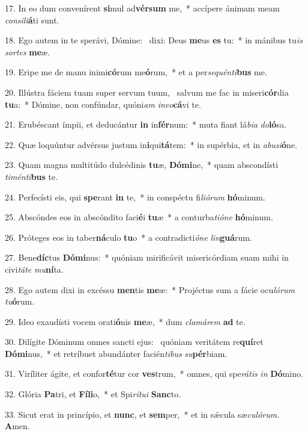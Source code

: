 17. In eo dum convenírent \textbf{si}mul ad\textbf{vér}\textbf{sum} me,~*  accípere ánimam meam \textit{con}\textit{si}\textit{li}\textbf{á}ti sunt.\

18. Ego autem in te sperávi, Dómine: \dag\  dixi: Deus \textbf{me}us \textbf{es} tu:~*  in mánibus tu\textit{is} \textit{sor}\textit{tes} \textbf{me}æ.\

19. Eripe me de manu inimi\textbf{có}rum me\textbf{ó}rum,~*  et a per\textit{se}\textit{quén}\textit{ti}\textbf{bus} me.\

20. Illústra fáciem tuam super servum tuum, \dag\  salvum me fac in miseri\textbf{cór}dia \textbf{tu}a:~*  Dómine, non confúndar, quóni\textit{am} \textit{in}\textit{vo}\textbf{cá}vi te.\

21. Erubéscant ímpii, et deducántur \textbf{in} in\textbf{fér}num:~*  muta fiant lá\textit{bi}\textit{a} \textit{do}\textbf{ló}sa.\

22. Quæ loquúntur advérsus justum in\textbf{i}qui\textbf{tá}tem:~*  in supérbia, et in \textit{ab}\textit{u}\textit{si}\textbf{ó}ne.\

23. Quam magna multitúdo dulcédinis \textbf{tu}æ, \textbf{Dó}\textbf{mi}ne,~*  quam abscondísti \textit{ti}\textit{mén}\textit{ti}\textbf{bus} te.\

24. Perfecísti eis, qui \textbf{spe}rant \textbf{in} te,~*  in conspéctu fi\textit{li}\textit{ó}\textit{rum} \textbf{hó}minum.\

25. Abscóndes eos in abscóndito faci\textbf{é}i \textbf{tu}æ~*  a conturba\textit{ti}\textit{ó}\textit{ne} \textbf{hó}minum.\

26. Próteges eos in taber\textbf{ná}culo \textbf{tu}o~*  a contradicti\textit{ó}\textit{ne} \textit{lin}\textbf{guá}rum.\

27. Bene\textbf{díc}tus \textbf{Dó}\textbf{mi}nus:~*  quóniam mirificávit misericórdiam suam mihi in civi\textit{tá}\textit{te} \textit{mu}\textbf{ní}ta.\

28. Ego autem dixi in excéssu \textbf{men}tis \textbf{me}æ:~*  Projéctus sum a fácie ocu\textit{ló}\textit{rum} \textit{tu}\textbf{ó}rum.\

29. Ideo exaudísti vocem orati\textbf{ó}nis \textbf{me}æ,~*  dum \textit{cla}\textit{má}\textit{rem} \textbf{ad} te.\

30. Dilígite Dóminum omnes sancti ejus: \dag\  quóniam veritátem re\textbf{quí}ret \textbf{Dó}\textbf{mi}nus,~*  et retríbuet abundánter facién\textit{ti}\textit{bus} \textit{su}\textbf{pér}biam.\

31. Viríliter ágite, et confor\textbf{té}tur cor \textbf{ves}trum,~*  omnes, qui spe\textit{rá}\textit{tis} \textit{in} \textbf{Dó}mino.\

32. Glória \textbf{Pa}tri, et \textbf{Fí}\textbf{li}o,~*  et Spi\textit{rí}\textit{tu}\textit{i} \textbf{Sanc}to.\

33. Sicut erat in princípio, et \textbf{nunc}, et \textbf{sem}per,~*  et in sǽcula sæ\textit{cu}\textit{ló}\textit{rum}. \textbf{A}men.\

